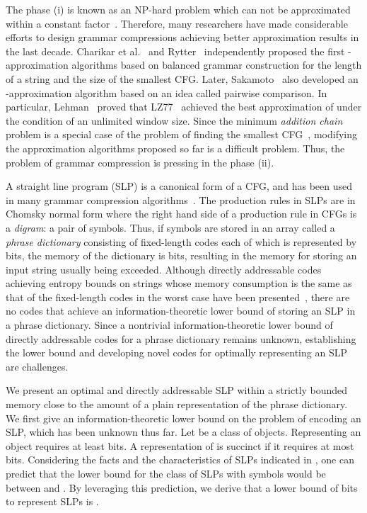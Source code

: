 \documentclass[10pt]{llncs}
\begin{document}
The phase (i) is known as an NP-hard problem which can not be approximated 
within a constant factor~\cite{Lehman-Shelat02}.
Therefore, many researchers have made considerable efforts to design grammar compressions 
achieving better approximation results in the last decade.
Charikar et al.~\cite{Charikar05} and Rytter~\cite{Rytter03} independently 
proposed the first -approximation algorithms based on balanced 
grammar construction for the length  of a string and the size  of the smallest CFG. 
Later, Sakamoto~\cite{Sakamoto05} also developed an -approximation algorithm 
based on an idea called pairwise comparison. 
In particular, Lehman~\cite{Lehman-Shelat02} proved that LZ77~\cite{LZ77} 
achieved the best approximation of  under the condition of an unlimited window size.
Since the minimum {\em addition chain} problem is a special case of the problem 
of finding the smallest CFG~\cite{LehmanPhD}, modifying the approximation algorithms proposed so far is a difficult problem. 
Thus, the problem of grammar compression is pressing in the phase (ii). 

A straight line program (SLP) is a canonical form of a CFG, 
and has been used in many grammar compression algorithms~\cite{LZ78,Larsson00,LZ77,Apostolico00,ESP}.
The production rules in SLPs are in Chomsky normal form 
where the right hand side of a production rule in CFGs is a {\em digram}: a pair of symbols.
Thus, if  symbols are stored in an array called a {\em phrase dictionary} 
consisting of  fixed-length codes each of which is represented by  bits, 
the memory of the dictionary is  bits, resulting in the memory for storing an input string usually being exceeded.
Although directly addressable codes achieving entropy bounds on strings whose memory consumption is the same as that of the fixed-length codes in the worst case have been presented~\cite{ferragina2007simple,sadakane2006squeezing,gonzalez2006statistical}, 
there are no codes that achieve an information-theoretic lower bound of storing an SLP in a phrase dictionary.
Since a nontrivial information-theoretic lower bound of directly addressable codes for a phrase dictionary remains unknown, 
establishing the lower bound and developing novel codes for optimally representing an SLP are challenges.


We present an optimal and directly addressable SLP within a strictly bounded memory close to 
the amount of a plain representation of the phrase dictionary.
We first give an information-theoretic lower bound on the problem of encoding an SLP, 
which has been unknown thus far. 
Let  be a class of objects.
Representing an object  requires at least  bits.
A representation of  is succinct if it requires at most  bits.
Considering the facts and the characteristics of SLPs indicated in \cite{ESP}, 
one can predict that the lower bound for the class of SLPs with  symbols 
would be between  and . 
By leveraging this prediction, we derive that a lower bound of bits to represent SLPs is .
\end{document}
